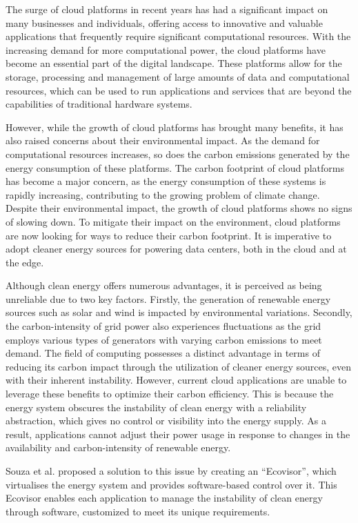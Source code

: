 The surge of cloud platforms in recent years has had a significant impact on
many businesses and individuals, offering access to innovative and valuable
applications that frequently require significant computational resources. With
the increasing demand for more computational power, the cloud platforms have
become an essential part of the digital landscape. These platforms allow for the
storage, processing and management of large amounts of data and computational
resources, which can be used to run applications and services that are beyond
the capabilities of traditional hardware systems.

However, while the growth of cloud platforms has brought many benefits, it has
also raised concerns about their environmental impact. As the demand for
computational resources increases, so does the carbon emissions generated by the
energy consumption of these platforms. The carbon footprint of cloud platforms
has become a major concern, as the energy consumption of these systems is
rapidly increasing, contributing to the growing problem of climate change.
Despite their environmental impact, the growth of cloud platforms shows no signs
of slowing down. To mitigate their impact on the environment, cloud platforms
are now looking for ways to reduce their carbon footprint. It is imperative to
adopt cleaner energy sources for powering data centers, both in the cloud and at
the edge.

Although clean energy offers numerous advantages, it is perceived as being
unreliable due to two key factors. Firstly, the generation of renewable energy
sources such as solar and wind is impacted by environmental variations.
Secondly, the carbon-intensity of grid power also experiences fluctuations as
the grid employs various types of generators with varying carbon emissions to
meet demand. The field of computing possesses a distinct advantage in terms of
reducing its carbon impact through the utilization of cleaner energy sources,
even with their inherent instability. However, current cloud applications are
unable to leverage these benefits to optimize their carbon efficiency. This is
because the energy system obscures the instability of clean energy with a
reliability abstraction, which gives no control or visibility into the energy
supply. As a result, applications cannot adjust their power usage in response to
changes in the availability and carbon-intensity of renewable energy.

Souza et al. proposed a solution to this issue by creating an
\enquote{Ecovisor}, which virtualises the energy system and provides
software-based control over it. This Ecovisor enables each application to manage
the instability of clean energy through software, customized to meet its unique
requirements.


